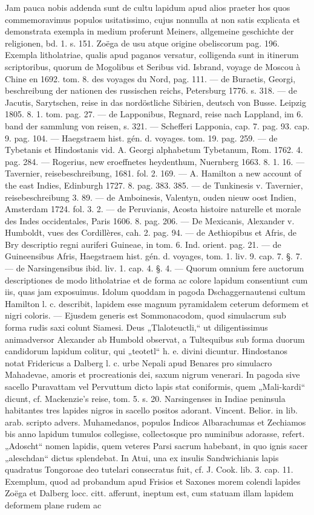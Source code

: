 \documentclass[a4paper, 11pt, oneside, polutonikogreek, german]{article}
\begin{document}
Jam pauca nobis addenda sunt de cultu lapidum apud alios praeter hos quos commemoravimus populos usitatissimo, cujus nonnulla at non satis explicata et demonstrata exempla in medium proferunt Meiners, allgemeine geschichte der religionen, bd. 1. s. 151. Zoëga de usu atque origine obeliscorum pag. 196. Exempla litholatriae, qualis apud paganos versatur, colligenda sunt in itinerum scriptoribus, quorum de Mogolibus et Seribus vid. Isbrand, voyage de Moscou à Chine en 1692. tom. 8. des voyages du Nord, pag. 111. --- de Buraetis, Georgi, beschreibung der nationen des russischen reichs, Petersburg 1776. s. 318. --- de Jacutis, Sarytschen, reise in das nordöstliche Sibirien, deutsch von Busse. Leipzig 1805. 8. 1. tom. pag. 27. --- de Lapponibus, Regnard, reise nach Lappland, im 6. band der sammlung von reisen, s. 321. --- Schefferi Lapponia, cap. 7. pag. 93. cap. 9. pag. 104. --- Haegstraem hist. gén. d. voyages. tom. 19. pag. 259. --- de Tybetanis et Hindostanis vid. A. Georgi alphabetum Tybetanum, Rom. 1762. 4. pag. 284. --- Rogerius, new eroeffnetes heydenthum, Nuernberg 1663. 8. 1. 16. --- Tavernier, reisebeschreibung, 1681. fol. 2. 169. --- A. Hamilton a new account of the east Indies, Edinburgh 1727. 8. pag. 383. 385. --- de Tunkinesis v. Tavernier, reisebeschreibung 3. 89. --- de Amboinesis, Valentyn, ouden nieuw oost Indien, Amsterdam 1724. fol. 3. 2. --- de Peruvianis, Acosta histoire naturelle et morale des Indes occidentales, Paris 1606. 8. pag. 206. --- De Mexicanis, Alexander v. Humboldt, vues des Cordillères, cah. 2. pag. 94. --- de Aethiopibus et Afris, de Bry descriptio regni auriferi Guineae, in tom. 6. Ind. orient. pag. 21. --- de Guineensibus Afris, Haegstraem hist. gén. d. voyages, tom. 1. liv. 9. cap. 7. §. 7. --- de Narsingensibus ibid. liv. 1. cap. 4. §. 4. --- Quorum omnium fere auctorum descriptiones de modo litholatriae et de forma ac colore lapidum consentiunt cum iis, quas jam exposuimus. Idolum quoddam in pagoda Dschaggernautensi cultum Hamilton l. c. describit, lapidem esse magnum pyramidalem ceterum deformem et nigri coloris. --- Ejusdem generis est Sommonacodom, quod simulacrum sub forma rudis saxi colunt Siamesi. Deus „Tlaloteuctli,“ ut diligentissimus animadversor Alexander ab Humbold observat, a Tultequibus sub forma duorum candidorum lapidum colitur, qui „teotetl“ h. e. divini dicuntur. Hindostanos notat Fridericus a Dalberg l. c. urbe Nepali apud Benares pro simulacro Mahadevae, amoris et procreationis dei, saxum nigrum venerari. In pagoda sive sacello Puravattam vel Pervuttum dicto lapis stat coniformis, quem „Mali-kardi“ dicunt, cf. Mackenzie's reise, tom. 5. s. 20. Narsingenses in Indiae peninsula habitantes tres lapides nigros in sacello positos adorant. Vincent. Belior. in lib. arab. scripto advers. Muhamedanos, populos Indicos Albarachumas et Zechiamos bis anno lapidum tumulos collegisse, collectosque pro numinibus adorasse, refert. „Adoscht“ nomen lapidis, quem veteres Parsi sacrum habebant, in quo ignis sacer „aleschdan“ dictus splendebat. In Atui, una ex insulis Sandwichianis lapis quadratus Tongoroae deo tutelari consecratus fuit, cf. J. Cook. lib. 3. cap. 11. Exemplum, quod ad probandum apud Frisios et Saxones morem colendi lapides Zoëga et Dalberg locc. citt. afferunt, ineptum est, cum statuam illam lapidem deformem plane rudem ac 
\end{document}
